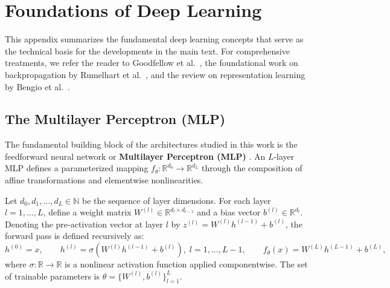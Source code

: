 \documentclass[11pt, oneside, openany]{book}
\begin{document}
\appendix

\chapter{Foundations of Deep Learning}
\label{app:A}

This appendix summarizes the fundamental deep learning concepts that serve as the technical basis for the developments in the main text. For comprehensive treatments, we refer the reader to Goodfellow et al.\ \cite{goodfellow2016deep}, the foundational work on backpropagation by Rumelhart et al.\ \cite{rumelhart1986learning}, and the review on representation learning by Bengio et al.\ \cite{bengio2013representation}.

\section{The Multilayer Perceptron (MLP)}
\label{sec:A.1}

The fundamental building block of the architectures studied in this work is the feedforward neural network or \textbf{Multilayer Perceptron (MLP)} \cite{goodfellow2016deep}. An $L$-layer MLP defines a parameterized mapping $f_{\theta} \colon \mathbb{R}^{d_{0}} \to \mathbb{R}^{d_{L}}$ through the composition of affine transformations and elementwise nonlinearities.

\begin{definition}
\label{def:A.1}
Let $d_{0}, d_{1}, \dots, d_{L} \in \mathbb{N}$ be the sequence of layer dimensions. For each layer $l = 1, \dots, L$, define a weight matrix $W^{(l)} \in \mathbb{R}^{d_{l} \times d_{l-1}}$ and a bias vector $b^{(l)} \in \mathbb{R}^{d_{l}}$. Denoting the pre-activation vector at layer $l$ by $z^{(l)} = W^{(l)} h^{(l-1)} + b^{(l)}$, the forward pass is defined recursively as:
\begin{equation}
\label{eq:A.1}
h^{(0)} = x, \qquad h^{(l)} = \sigma\left(W^{(l)} h^{(l-1)} + b^{(l)}\right), \; l = 1, \dots, L-1, \qquad f_{\theta}(x) = W^{(L)} h^{(L-1)} + b^{(L)},
\end{equation}
where $\sigma \colon \mathbb{R} \to \mathbb{R}$ is a nonlinear activation function applied componentwise. The set of trainable parameters is $\theta = \{W^{(l)}, b^{(l)}\}_{l=1}^{L}$.
\end{definition}
\end{document}
